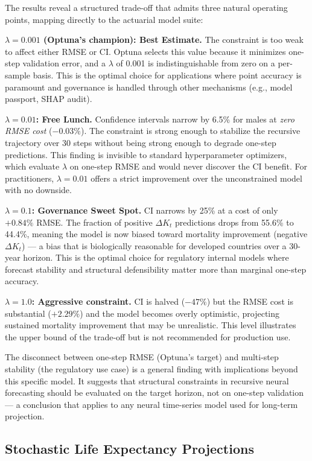 \documentclass[11pt,a4paper]{article}
\begin{document}
The results reveal a structured trade-off that admits three natural operating points, mapping directly to the actuarial model suite:

\textbf{$\lambda = 0.001$ (Optuna's champion): Best Estimate.} The constraint is too weak to affect either RMSE or CI. Optuna selects this value because it minimizes one-step validation error, and a $\lambda$ of 0.001 is indistinguishable from zero on a per-sample basis. This is the optimal choice for applications where point accuracy is paramount and governance is handled through other mechanisms (e.g., model passport, SHAP audit).

\textbf{$\lambda = 0.01$: Free Lunch.} Confidence intervals narrow by 6.5\% for males at \textit{zero RMSE cost} ($-0.03\%$). The constraint is strong enough to stabilize the recursive trajectory over 30 steps without being strong enough to degrade one-step predictions. This finding is invisible to standard hyperparameter optimizers, which evaluate $\lambda$ on one-step RMSE and would never discover the CI benefit. For practitioners, $\lambda = 0.01$ offers a strict improvement over the unconstrained model with no downside.

\textbf{$\lambda = 0.1$: Governance Sweet Spot.} CI narrows by 25\% at a cost of only $+0.84\%$ RMSE. The fraction of positive $\Delta K_t$ predictions drops from 55.6\% to 44.4\%, meaning the model is now biased toward mortality improvement (negative $\Delta K_t$) --- a bias that is biologically reasonable for developed countries over a 30-year horizon. This is the optimal choice for regulatory internal models where forecast stability and structural defensibility matter more than marginal one-step accuracy.

\textbf{$\lambda = 1.0$: Aggressive constraint.} CI is halved ($-47\%$) but the RMSE cost is substantial ($+2.29\%$) and the model becomes overly optimistic, projecting sustained mortality improvement that may be unrealistic. This level illustrates the upper bound of the trade-off but is not recommended for production use.

The disconnect between one-step RMSE (Optuna's target) and multi-step stability (the regulatory use case) is a general finding with implications beyond this specific model. It suggests that structural constraints in recursive neural forecasting should be evaluated on the target horizon, not on one-step validation --- a conclusion that applies to any neural time-series model used for long-term projection.

\subsection{Stochastic Life Expectancy Projections}
\end{document}
